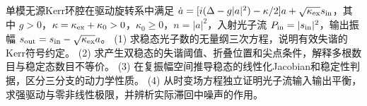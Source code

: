 单模无源Kerr环腔在驱动旋转系中满足
\(\dot a=[i(\Delta-g|a|^2)-\kappa/2]a+\sqrt{\kappa_{\rm ex}}s_{\rm in}\)，其中 \(g>0\)，\(\kappa=\kappa_{\rm ex}+\kappa_0>0\)，\(\kappa_0\ge0\)，\(n=|a|^2\)，入射光子流 \(P_{\rm in}=|s_{\rm in}|^2\)，输出振幅 \(s_{\rm out}=s_{\rm in}-\sqrt{\kappa_{\rm ex}}a\)。
(1) 求稳态光子数的无量纲三次方程，说明有效失谐的Kerr符号约定。
(2) 求产生双稳态的失谐阈值、折叠位置和尖点条件，解释多根数目与稳定态数目不等价。
(3) 在复振幅空间推导稳态的线性化Jacobian和稳定性判据，区分三分支的动力学性质。
(4) 从时变场方程独立证明光子流输入输出平衡，求强驱动与零非线性极限，并辨析实际滞回中噪声的作用。
